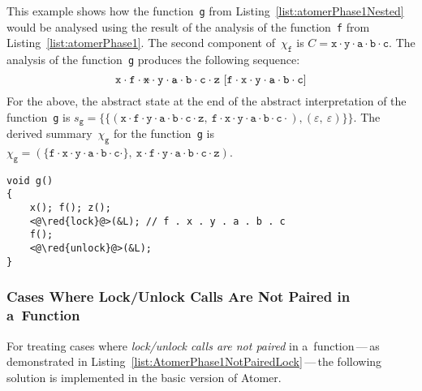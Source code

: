 \begin{example}
    This example shows how the function~\texttt{g} from Listing~\ref{list:atomerPhase1Nested} would be analysed using the result of the analysis of the function~\texttt{f} from Listing~\ref{list:atomerPhase1}. The second component of~$ \chi_\mathtt{f} $ is $ C = \mathtt{x} \cdot \mathtt{y} \cdot \mathtt{a} \cdot \mathtt{b} \cdot \mathtt{c} $. The analysis of the function~\texttt{g} produces the following sequence:
    $$
        \mathtt{x} \cdot \mathtt{f} \cdot \text{\texttt{\sout{x}}} \cdot \mathtt{y} \cdot \mathtt{a} \cdot \mathtt{b} \cdot \mathtt{c} \cdot \mathtt{z}\ [\mathtt{f} \cdot \mathtt{x} \cdot \mathtt{y} \cdot \mathtt{a} \cdot \mathtt{b} \cdot \mathtt{c}]
    $$
    For the above, the abstract state at the end of the abstract interpretation of the function~\texttt{g} is $ s_\mathtt{g} = \{\{(\mathtt{x} \cdot \mathtt{f} \cdot \mathtt{y} \cdot \mathtt{a} \cdot \mathtt{b} \cdot \mathtt{c} \cdot \mathtt{z},\ \mathtt{f} \cdot \mathtt{x} \cdot \mathtt{y} \cdot \mathtt{a} \cdot \mathtt{b} \cdot \mathtt{c} \cdot), (\varepsilon,\ \varepsilon)\}\} $. The derived summary~$ \chi_\mathtt{g} $ for the function~\texttt{g} is $ \chi_\mathtt{g} = (\{\mathtt{f} \cdot \mathtt{x} \cdot \mathtt{y} \cdot \mathtt{a} \cdot \mathtt{b} \cdot \mathtt{c} \cdot\},\ \mathtt{x} \cdot \mathtt{f} \cdot \mathtt{y} \cdot \mathtt{a} \cdot \mathtt{b} \cdot \mathtt{c} \cdot \mathtt{z}) $.
\end{example}

\begin{lstlisting}[style=c, label={list:atomerPhase1Nested}, float=hbt, caption={A~code snippet used to illustrate the derivation of sequences of functions called atomically with a~\emph{nested function call} (function~\texttt{f} is defined in Listing~\ref{list:atomerPhase1})}]
void g()
{
    x(); f(); z();
    <@\red{lock}@>(&L); // f . x . y . a . b . c
    f();
    <@\red{unlock}@>(&L);
}
\end{lstlisting}

\subsubsection{Cases Where Lock/Unlock Calls Are Not Paired in a~Function}

For treating cases where \emph{lock/unlock calls are not paired} in a~function\,---\,as demonstrated in Listing~\ref{list:AtomerPhase1NotPairedLock}\,---\,the following solution is implemented in the basic version of Atomer.

